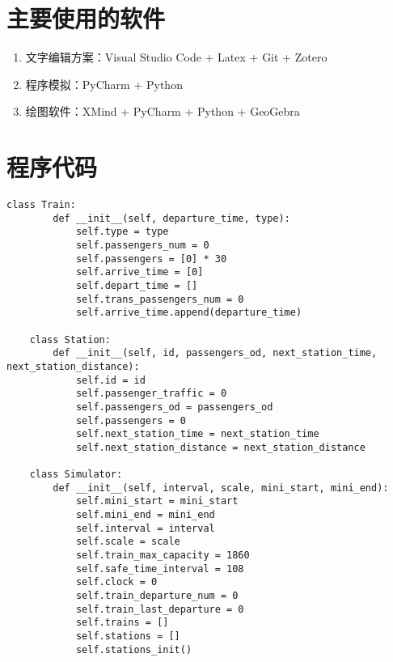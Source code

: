 

\nocite{*}      %





\appendix
\section{主要使用的软件}

\begin{enumerate}
    \item 文字编辑方案：Visual Studio Code + Latex + Git + Zotero
    \item 程序模拟：PyCharm + Python
    \item 绘图软件：XMind + PyCharm + Python + GeoGebra
\end{enumerate}

\section{程序代码}

\begin{lstlisting}[caption={类的定义语句}]
    class Train:
        def __init__(self, departure_time, type):
            self.type = type
            self.passengers_num = 0
            self.passengers = [0] * 30
            self.arrive_time = [0]
            self.depart_time = []
            self.trans_passengers_num = 0
            self.arrive_time.append(departure_time)
    
    class Station:
        def __init__(self, id, passengers_od, next_station_time, next_station_distance):
            self.id = id
            self.passenger_traffic = 0
            self.passengers_od = passengers_od
            self.passengers = 0
            self.next_station_time = next_station_time
            self.next_station_distance = next_station_distance
    
    class Simulator:
        def __init__(self, interval, scale, mini_start, mini_end):
            self.mini_start = mini_start
            self.mini_end = mini_end
            self.interval = interval
            self.scale = scale
            self.train_max_capacity = 1860
            self.safe_time_interval = 108
            self.clock = 0
            self.train_departure_num = 0
            self.train_last_departure = 0
            self.trains = []
            self.stations = []
            self.stations_init()
    
    \end{lstlisting}